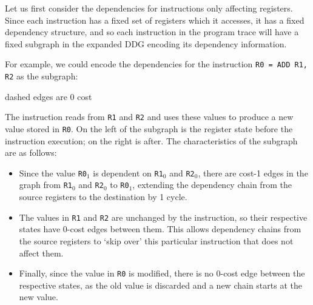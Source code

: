Let us first consider the dependencies for instructions only affecting registers.
Since each instruction has a fixed set of registers which it accesses, it has a fixed dependency structure, and so each 
instruction in the program trace will have a fixed subgraph in the expanded DDG encoding its dependency information.

For example, we could encode the dependencies for the instruction \verb|R0 = ADD R1, R2| as the subgraph:

\begin{center}

{\tiny dashed edges are 0 cost}
\end{center}

The instruction reads from \verb|R1| and \verb|R2| and uses these values to produce a new value stored in \verb|R0|.
On the left of the subgraph is the register state before the instruction execution; on the right is after. The 
characteristics of the subgraph are as follows:
\begin{itemize}
  \item Since the value \verb|R0|$_1$ is dependent on \verb|R1|$_0$ and \verb|R2|$_0$, there are cost-1 edges in the graph 
    from \verb|R1|$_0$ and \verb|R2|$_0$ to \verb|R0|$_1$, extending the dependency chain from the source registers to the 
    destination by 1 cycle.

  \item The values in \verb|R1| and \verb|R2| are unchanged by the instruction, so their respective states have 0-cost 
    edges between them. This allows dependency chains from the source registers to `skip over' this particular instruction 
    that does not affect them.

  \item Finally, since the value in \verb|R0| is modified, there is no 0-cost edge between the respective states, as the 
    old value is discarded and a new chain starts at the new value.
\end{itemize}


